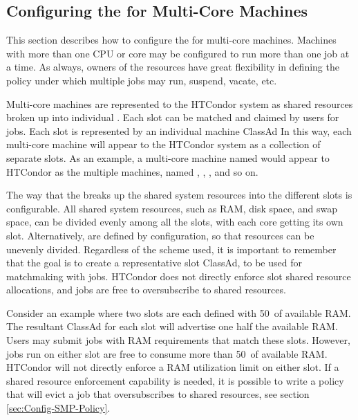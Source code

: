 \subsection{\label{sec:Configuring-SMP}
Configuring the  for Multi-Core Machines}

This section describes how to configure the  for multi-core
machines.
Machines with more than one CPU or core may
be configured to run more than one job at a time.
As always, owners of the resources have great flexibility in defining
the policy under which multiple jobs may run, suspend, vacate, etc.  

Multi-core machines are represented to the HTCondor system as
shared resources broken up into individual .
Each slot can be matched and claimed by users for jobs.
Each slot is represented by an individual machine ClassAd
In this way, each multi-core machine will appear to the HTCondor system as
a collection of separate slots.  
As an example, a multi-core machine named
 would appear to HTCondor as the
multiple machines, named ,
,
, and so on.

The way that the  breaks up the
shared system resources into the different slots
is configurable.
All shared system resources, such as RAM, disk space, and swap space,
can be divided evenly among all the slots, with each
core getting its own slot.
Alternatively, 
 are defined by configuration, 
so that resources can be unevenly divided.
Regardless of the scheme used, it is important
to remember that the goal is to create a representative slot ClassAd,
to be used for matchmaking with jobs.
HTCondor does not
directly enforce slot shared resource allocations, and jobs
are free to oversubscribe to shared resources.

Consider an example where two slots are each defined with 50\Percent\ of
available RAM.  The resultant ClassAd for each slot will advertise one
half the available RAM.  Users may submit jobs with RAM requirements
that match these slots.  However, jobs run on either slot are free to
consume more than 50\Percent\ of available RAM.  HTCondor will not
directly enforce a RAM utilization limit on either slot.  If a shared
resource enforcement capability is needed, 
it is possible to write a
policy that will evict a job that oversubscribes to shared
resources, see section \ref{sec:Config-SMP-Policy}.

